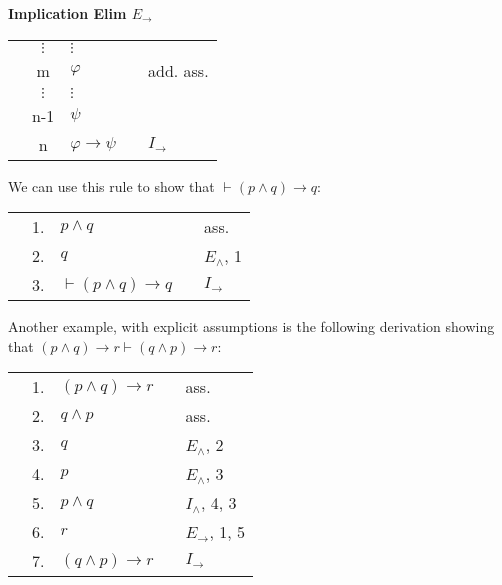 \documentclass[nobib,nofonts]{tufte-handout}
\begin{document}
\bigskip
\noindent \colorbox{mygray!60}{\centering
  \begin{minipage}[t]{0.35\linewidth}
    \textbf{Implication Elim $E_{\rightarrow}$}
  \end{minipage}
  \begin{minipage}[t]{0.55\linewidth}
    \begin{tabular}{cclcl}
                         & $\vdots$  & $\vdots$                   & \\
      \cline{1-2} \vline & m         & $\varphi$                  & & add. ass.  \\
      \vline             & $ \vdots$ & $\vdots$                   & \\
      \vline             & n-1       & $\psi$                     & & \\ \hline
                         & n         & $\varphi \rightarrow \psi$ & & $I_{\rightarrow}$
    \end{tabular}
  \end{minipage}
}
\bigskip

We can use this rule to show that $\vdash (p \wedge q) \rightarrow q$:

\begin{tabular}{cclcl}
   \cline{1-2} \vline & 1. & $p \wedge q$                        & & ass.  \\
   \vline             & 2. & $q$                                 & & $E_{\wedge}$, 1 \\ \hline
                      & 3. & $\vdash (p \wedge q) \rightarrow q$ & & $I_{\rightarrow}$ \\
\end{tabular}

Another example, with explicit assumptions is the following derivation showing that  $(p \wedge q) \rightarrow r \vdash (q \wedge p) \rightarrow r$:

\begin{tabular}{cclcl}
                     & 1. & $(p \wedge q) \rightarrow r$ & & ass. \\
  \cline{1-2} \vline & 2. & $q \wedge p$                 & & ass. \\
  \vline             & 3. & $q$                          & & $E_{\wedge}$, 2  \\
  \vline             & 4. & $p$                          & & $E_{\wedge}$, 3  \\
  \vline             & 5. & $p \wedge q$                 & & $I_{\wedge}$, 4, 3  \\
  \vline             & 6. & $r$                          & & $E_{\rightarrow}$, 1, 5  \\ \hline
                     & 7. & $(q \wedge p) \rightarrow r$ & & $I_{\rightarrow}$
\end{tabular}
\end{document}
